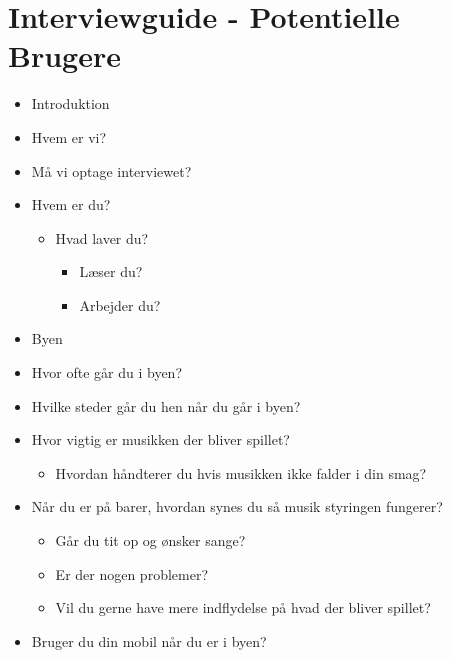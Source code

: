 \chapter{Interviewguide - Potentielle Brugere}
\label{app:interviewguidePotentielleBrugere_guide}

\begin{itemize}

\item
  Introduktion
\item
  Hvem er vi?
\item
  Må vi optage interviewet?
\item
  Hvem er du?

  \begin{itemize}
  
  \item
    Hvad laver du?

    \begin{itemize}
    
    \item
      Læser du?
    \item
      Arbejder du?
    \end{itemize}
  \end{itemize}
\item
  Byen
\item
  Hvor ofte går du i byen?
\item
  Hvilke steder går du hen når du går i byen?
\item
  Hvor vigtig er musikken der bliver spillet?

  \begin{itemize}
  
  \item
    Hvordan håndterer du hvis musikken ikke falder i din smag?
  \end{itemize}
\item
  Når du er på barer, hvordan synes du så musik styringen fungerer?

  \begin{itemize}
  
  \item
    Går du tit op og ønsker sange?
  \item
    Er der nogen problemer?
  \item
    Vil du gerne have mere indflydelse på hvad der bliver spillet?
  \end{itemize}
\item
  Bruger du din mobil når du er i byen?

  \begin{itemize}
  

\end{itemize}
\end{itemize}
